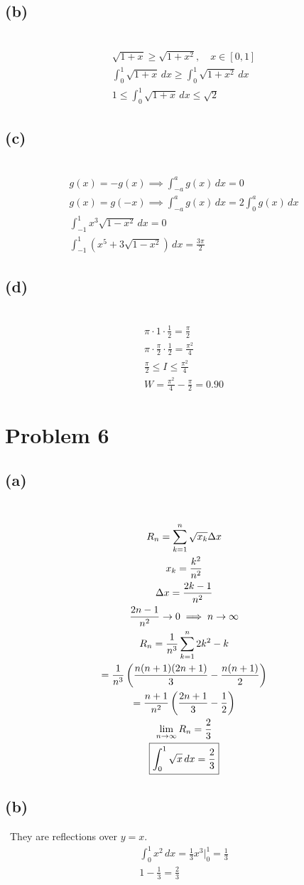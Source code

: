\documentclass[12pt]{article}
\newcommand*{\paren}[1]{\ensuremath\left(#1\right)}
\newcommand{\problem}[1]{\section{Problem #1}}
\newcommand{\subproblem}[1]{\subsection{(#1)} \,}
\begin{document}
\subproblem{b}
\begin{gather*}
    \sqrt{1+x} \ge \sqrt{1+x^2}, \quad x\in [0,1]\\
    \int_0^1 \sqrt{1+x} \, dx\ge \int_0^1 \sqrt{1+x^2} \, dx\\
    1 \le \int_0^1 \sqrt{1+x} \, dx \le \sqrt{2}
\end{gather*}

\subproblem{c}
\begin{gather*}
    g(x)=-g(x) \implies \int_{-a}^ag(x) \, dx=0\\
    g(x)=g(-x) \implies \int_{-a}^ag(x) \, dx= 2 \int_{0}^ag(x) \, dx\\
    \int_{-1}^1 x^3\sqrt{1-x^2} \, dx =0\\
    \int_{-1}^1 (x^5+3\sqrt{1-x^2}) \, dx = \frac{3\pi}{2}
\end{gather*}

\subproblem{d}
\begin{gather*}
    \pi \cdot 1\cdot \frac{1}{2}=\frac{\pi}{2}\\
    \pi \cdot \frac{\pi}{2} \cdot \frac{1}{2}=\frac{\pi^2}{4}\\
    \frac{\pi}{2} \le I\le \frac{\pi^2}{4}\\
    W=\frac{\pi^2}{4}-\frac{\pi}{2}=0.90
\end{gather*}

\problem{6}

\subproblem{a}
\begin{gather*}
    R_n=\sum_{k=1}^n \sqrt{x_k} \Delta x\\
    x_k=\frac{k^2}{n^2}\\
    \Delta x=\frac{2k-1}{n^2}\\
    \frac{2n-1}{n^2} \to 0 \implies n\to \infty\\
    R_n=\frac{1}{n^3}\sum_{k=1}^n 2k^2-k\\
    =\frac{1}{n^3}\paren{\frac{n(n+1)(2n+1)}{3}-\frac{n(n+1)}{2}}\\
    =\frac{n+1}{n^2} \paren{\frac{2n+1}{3}-\frac{1}{2}}\\
    \lim_{n\to \infty } R_n=\frac{2}{3}\\
    \boxed{\int_0^1 \sqrt{x} \,  dx =\frac{2}{3}}
\end{gather*}

\subproblem{b}
They are reflections over $y=x$.
\begin{gather*}
    \int_0^1 x^2 \, dx =\frac{1}{3}x^3 \Big|^1_0=\frac{1}{3}\\
    1-\frac{1}{3}=\frac{2}{3}
\end{gather*}
\end{document}
